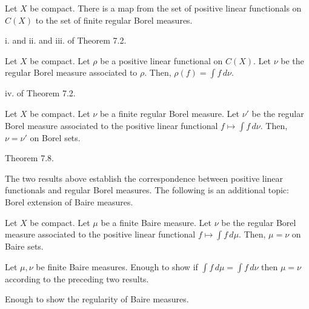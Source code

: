 \documentclass{../../large}
\begin{document}
\begin{prb}
Let $X$ be compact.
There is a map from the set of positive linear functionals on $C(X)$ to the set of finite regular Borel measures.
\end{prb}
\begin{sol}
i. and ii. and iii. of Theorem 7.2.
\end{sol}

\begin{prb}
Let $X$ be compact.
Let $\rho$ be a positive linear functional on $C(X)$.
Let $\nu$ be the regular Borel measure associated to $\rho$.
Then, $\rho(f)=\int f\,d\nu$.
\end{prb}
\begin{sol}
iv. of Theorem 7.2.
\end{sol}

\begin{prb}
Let $X$ be compact.
Let $\nu$ be a finite regular Borel measure.
Let $\nu'$ be the regular Borel measure associated to the positive linear functional $f\mapsto\int f\,d\nu$.
Then, $\nu=\nu'$ on Borel sets.
\end{prb}
\begin{sol}
Theorem 7.8.
\end{sol}

The two results above establish the correspondence between positive linear functionals and regular Borel measures.
The following is an additional topic: Borel extension of Baire measures.
\begin{prb}
Let $X$ be compact.
Let $\mu$ be a finite Baire measure.
Let $\nu$ be the regular Borel measure associated to the positive linear functional $f\mapsto\int f\,d\mu$.
Then, $\mu=\nu$ on Baire sets.
\end{prb}
\begin{sol}
Let $\mu,\nu$ be finite Baire measures.
Enough to show if $\int f\,d\mu=\int f\,d\nu$ then $\mu=\nu$ according to the preceding two results.

Enough to show the regularity of Baire measures.
\end{sol}
\end{document}
